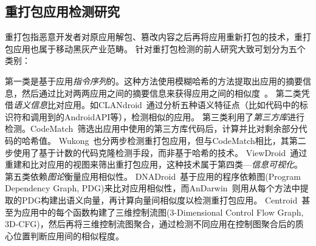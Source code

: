 \subsection{重打包应用检测研究}
\label{sec:repackaging}
重打包指恶意开发者对原应用解包、篡改内容之后再将应用重新打包的技术，重打包应用也属于移动黑灰产业范畴。
针对重打包检测的前人研究大致可划分为五个类别：

第一类是基于应用\textit{指令序列}的。这种方法使用模糊哈希的方法提取出应用的摘要信息，然后通过比对两两应用之间的摘要信息来获得应用之间的相似度~\cite{DroidMOSS, Zheng2013DroidAnalyticsA}。
第二类凭借\textit{语义信息}比对应用。如CLANdroid~\cite{CLANdroid}通过分析五种语义特征点（比如代码中的标识符和调用到的AndroidAPI等），检测相似的应用。
第三类利用了\textit{第三方库}进行检测。CodeMatch~\cite{CodeMatch}筛选出应用中使用的第三方库代码后，计算并比对剩余部分代码的哈希值。
Wukong~\cite{Wukong}也分两步检测重打包应用，但与CodeMatch相比，其第二步使用了基于计数的代码克隆检测手段，而非基于哈希的技术。
ViewDroid~\cite{ViewDroid}通过重建和比对应用的视图来筛出重打包应用，这种技术属于第四类---\textit{信息可视化}。
第五类依赖\textit{图论}衡量应用相似性。
DNADroid~\cite{DNADroid}基于应用的程序依赖图(Program Dependency Graph, PDG)来比对应用相似性，而AnDarwin~\cite{AnDarwin}则用从每个方法中提取的PDG构建出语义向量，再计算向量间相似度以检测重打包应用。
Centroid~\cite{Centroid}甚至为应用中的每个函数构建了三维控制流图(3-Dimensional Control Flow Graph, 3D-CFG)，然后再将三维控制流图聚合，通过检测不同应用在控制图聚合后的质心位置判断应用间的相似程度。

